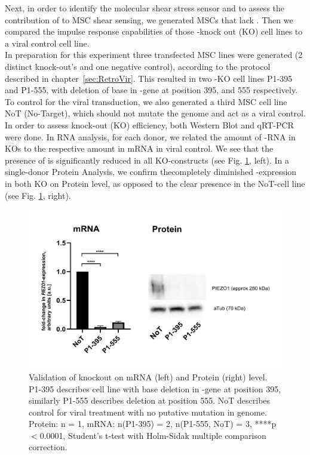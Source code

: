 Next, in order to identify the molecular shear stress sensor and to assess the contribution of \Piezo{} to MSC shear sensing, we generated MSCs that lack \Piezo{}. Then we compared the impulse response capabilities of those \Piezo{}-knock out (KO) cell lines to a viral control cell line.\\
In preparation for this experiment three transfected MSC lines were generated (2 distinct \Piezo{} knock-out's and one negative control), according to the protocol described in chapter~\vref{sec:RetroVir}. This resulted in two \Piezo{}-KO cell lines P1-395 and P1-555, with deletion of base in \PiezoGene{}-gene at position 395, and 555 respectively. To control for the viral transduction, we also generated a third MSC cell line NoT (No-Target), which should not mutate the genome and act as a viral control.\\ 
In order to assess knock-out (KO) efficiency, both Western Blot and qRT-PCR were done.
In RNA analysis, for each donor, we related the amount of \PiezoGene{}-RNA in KOs to the respective amount in mRNA in viral control. We see that the presence of \PiezoGene{} is significantly reduced in all KO-constructs (see Fig. \ref{fig:KO-Verification}, left). In a single-donor Protein Analysis, we confirm thecompletely diminished \Piezo{}-expression in both KO on Protein level, as opposed to the clear presence in the NoT-cell line (see Fig. \ref{fig:KO-Verification}, right).

\begin{figure}
	\centering
	\includegraphics[width=\linewidth]{Piezo1KO_Verification_WBandPCR.png}
	\caption{Validation of knockout on mRNA (left) and Protein (right) level. P1-395 describes cell line with base deletion in \PiezoGene{}-gene at position 395, similarly P1-555 describes deletion at position 555. NoT describes control for viral treatment with no putative mutation in genome. Protein: n = 1, mRNA:  n(P1-395) = 2, n(P1-555, NoT) = 3, ****p$<$0.0001, Student's t-test with Holm-Sidak multiple comparison correction.}
	\label{fig:KO-Verification}
\end{figure}


